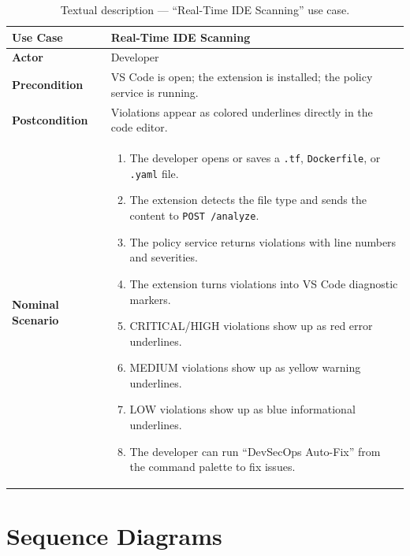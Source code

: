 \begin{table}[H]
\centering
\begin{tabularx}{\textwidth}{|l|X|}
\hline
\textbf{Use Case} & Real-Time IDE Scanning \\
\hline
\textbf{Actor} & Developer \\
\hline
\textbf{Precondition} & VS Code is open; the extension is installed; the policy service is running. \\
\hline
\textbf{Postcondition} & Violations appear as colored underlines directly in the code editor. \\
\hline
\textbf{Nominal Scenario} &
  \begin{enumerate}[leftmargin=0.8cm, nosep]
    \item The developer opens or saves a \texttt{.tf}, \texttt{Dockerfile}, or \texttt{.yaml} file.
    \item The extension detects the file type and sends the content to \texttt{POST /analyze}.
    \item The policy service returns violations with line numbers and severities.
    \item The extension turns violations into VS Code diagnostic markers.
    \item CRITICAL/HIGH violations show up as red error underlines.
    \item MEDIUM violations show up as yellow warning underlines.
    \item LOW violations show up as blue informational underlines.
    \item The developer can run ``DevSecOps Auto-Fix'' from the command palette to fix issues.
  \end{enumerate} \\
\hline
\end{tabularx}
\caption{Textual description --- ``Real-Time IDE Scanning'' use case.}
\label{tab:uc-vscode}
\end{table}


\section{Sequence Diagrams}

